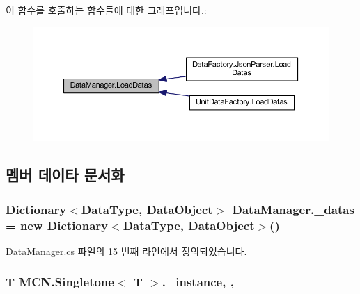 이 함수를 호출하는 함수들에 대한 그래프입니다.\+:
\nopagebreak
\begin{figure}[H]
\begin{center}
\leavevmode
\includegraphics[width=350pt]{class_data_manager_a00011c93858e3f4ff45ee740b62a6035_icgraph}
\end{center}
\end{figure}




\subsection{멤버 데이타 문서화}
\subsubsection[{\texorpdfstring{\+\_\+datas}{_datas}}]{\setlength{\rightskip}{0pt plus 5cm}Dictionary$<${\bf Data\+Type}, {\bf Data\+Object}$>$ Data\+Manager.\+\_\+datas = new Dictionary$<${\bf Data\+Type}, {\bf Data\+Object}$>$()\hspace{0.3cm}{\ttfamily [private]}}\hypertarget{class_data_manager_a01ff3ff6f614ac0840d1209110710666}{}\label{class_data_manager_a01ff3ff6f614ac0840d1209110710666}


Data\+Manager.\+cs 파일의 15 번째 라인에서 정의되었습니다.

\subsubsection[{\texorpdfstring{\+\_\+instance}{_instance}}]{\setlength{\rightskip}{0pt plus 5cm}T {\bf M\+C\+N.\+Singletone}$<$ T $>$.\+\_\+instance\hspace{0.3cm}{\ttfamily [static]}, {\ttfamily [protected]}, {\ttfamily [inherited]}}\hypertarget{class_m_c_n_1_1_singletone_a267e8a9e6e7c073b988cda4f95e26eb1}{}\label{class_m_c_n_1_1_singletone_a267e8a9e6e7c073b988cda4f95e26eb1}


